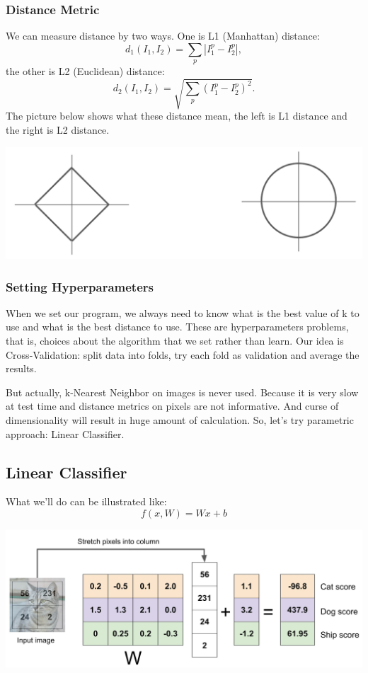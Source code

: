 \documentclass{article}
\begin{document}
\subsubsection{Distance Metric}
We can measure distance by two ways. One is L1 (Manhattan) distance:
\[d_1(I_1,I_2) = \sum\limits_p|I_1^p - I_2^p|,\]
the other is L2 (Euclidean) distance:
\[d_2(I_1,I_2) = \sqrt{\sum\limits_p(I_1^p - I_2^p)^2}.\]
The picture below shows what these distance mean, the left is L1 distance and the right is L2 distance.
\begin{center}
\includegraphics[scale=0.5]{distance.png}
\end{center}

\subsubsection{Setting Hyperparameters}
When we set our program, we always need to know what is the best value of k to use and what is the best distance to use. These are hyperparameters problems, that is, choices about the algorithm that we set rather than learn. Our idea is Cross-Validation: split data into folds, try each fold as validation and average the results.

But actually, k-Nearest Neighbor on images is never used. Because it is very slow at test time and distance metrics on pixels are not informative. And curse of dimensionality will result in huge amount of calculation. So, let's try parametric approach: Linear Classifier.

\subsection{Linear Classifier}
What we'll do can be illustrated like:
\[f(x,W) = Wx + b\]
\begin{center}
\includegraphics[scale=0.8]{linear.jpg}
\end{center}
\end{document}
